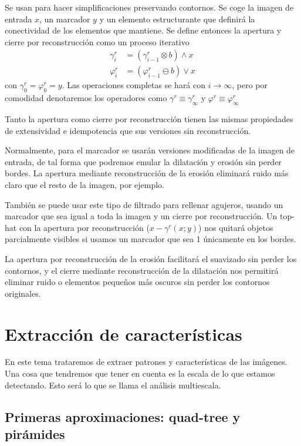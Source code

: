 \documentclass[nochap,palatino]{apuntes}
\begin{document}
Se usan para hacer simplificaciones preservando contornos. Se coge la imagen de entrada $x$, un marcador $y$ y un elemento estructurante que definirá la conectividad de los elementos que mantiene. Se define entonces la apertura y cierre por reconstrucción como un proceso iterativo\begin{align*}
γ^r_i &= (γ^r_{i-1} \otimes b) \wedge x \\
φ^r_i &= (φ^r_{i-1} \ominus b) \vee x
\end{align*} con $γ^r_0 = φ^r_0 = y$. Las operaciones completas se hará con $i \to ∞$, pero por comodidad denotaremos los operadores como $γ^r \equiv γ^r_{∞}$ y $φ^r \equiv φ^r_{∞}$

Tanto la apertura como cierre por reconstrucción tienen las mismas propiedades de extensividad e idempotencia que sus versiones sin reconstrucción.

Normalmente, para el marcador se usarán versiones modificadas de la imagen de entrada, de tal forma que podremos emular la dilatación y erosión sin perder bordes. La apertura mediante reconstrucción de la erosión eliminará ruido más claro que el resto de la imagen, por ejemplo.

También se puede usar este tipo de filtrado para rellenar agujeros, usando un marcador que sea igual a toda la imagen y un cierre por reconstrucción. Un top-hat con la apertura por reconstrucción ($x - γ^r (x;y)$) nos quitará objetos parcialmente visibles si usamos un marcador que sea 1 únicamente en los bordes.

La apertura por reconstrucción de la erosión facilitará el suavizado sin perder los contornos, y el cierre mediante reconstrucción de la dilatación nos permitirá eliminar ruido o elementos pequeños más oscuros sin perder los contornos originales.

\section{Extracción de características}

En este tema trataremos de extraer patrones y características de las imágenes. Una cosa que tendremos que tener en cuenta es la escala de lo que estamos detectando. Esto será lo que se llama el análisis multiescala.

\subsection{Primeras aproximaciones: quad-tree y pirámides}
\end{document}
